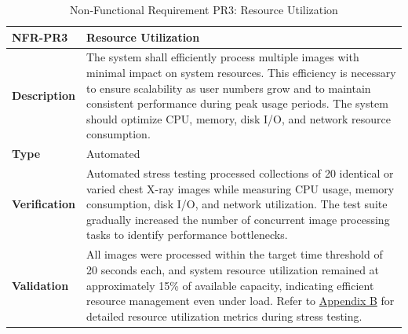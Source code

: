 \documentclass[12pt, titlepage]{article}
\begin{document}
\begin{table}[H]
\centering
{}
\begin{tabular}{|p{3.5cm}|p{11.5cm}|}
\hline
\rowcolor{gray!30}
\textbf{NFR-PR3} & \textbf{Resource Utilization} \\
\hline
\textbf{Description} & The system shall efficiently process multiple images with minimal impact on system resources. This efficiency is necessary to ensure scalability as user numbers grow and to maintain consistent performance during peak usage periods. The system should optimize CPU, memory, disk I/O, and network resource consumption. \\
\hline
\textbf{Type} & Automated \\
\hline
\textbf{Verification} & Automated stress testing processed collections of 20 identical or varied chest X-ray images while measuring CPU usage, memory consumption, disk I/O, and network utilization. The test suite gradually increased the number of concurrent image processing tasks to identify performance bottlenecks. \\
\hline
\textbf{Validation} & All images were processed within the target time threshold of 20 seconds each, and system resource utilization remained at approximately 15\% of available capacity, indicating efficient resource management even under load. Refer to \hyperref[appendix:B]{Appendix B} for detailed resource utilization metrics during stress testing. \\
\hline
\end{tabular}
\caption{Non-Functional Requirement PR3: Resource Utilization}
\end{table}
\end{document}
